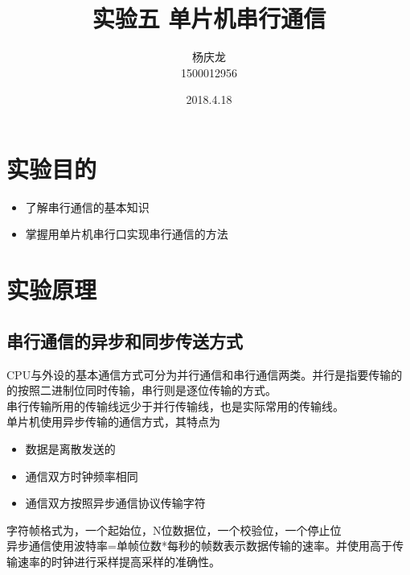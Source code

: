 \documentclass{article}
\begin{document}

\begin{CJK}{UTF8}{gkai}
\title{实验五 单片机串行通信}
\author{杨庆龙 \\1500012956}
\date{2018.4.18}
\maketitle
\section{实验目的}
\begin{itemize}
  \item 了解串行通信的基本知识
  \item 掌握用单片机串行口实现串行通信的方法
\end{itemize}
\section{实验原理}
\subsection{串行通信的异步和同步传送方式}
CPU与外设的基本通信方式可分为并行通信和串行通信两类。并行是指要传输的的按照二进制位同时传输，串行则是逐位传输的方式。\\
串行传输所用的传输线远少于并行传输线，也是实际常用的传输线。\\
单片机使用异步传输的通信方式，其特点为
\begin{itemize}
  \item 数据是离散发送的
  \item 通信双方时钟频率相同
  \item 通信双方按照异步通信协议传输字符
\end{itemize}
字符帧格式为，一个起始位，N位数据位，一个校验位，一个停止位\\
异步通信使用波特率=单帧位数*每秒的帧数表示数据传输的速率。并使用高于传输速率的时钟进行采样提高采样的准确性。

\end{CJK}
\end{document}
